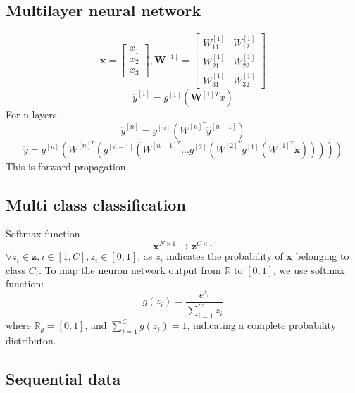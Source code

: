 \documentclass{article}
\begin{document}
\subsection*{Multilayer neural network}
\[\textbf{x} = \begin{bmatrix}
    x_1 \\ x_2\\x_3
    \end{bmatrix}, \textbf{W}^{[1]} = \begin{bmatrix}
        W^{[1]}_{11} & W^{[1]}_{12} \\ W^{[1]}_{21} & W^{[1]}_{22}\\ W^{[1]}_{31} & W^{[1]}_{32} 
        \end{bmatrix}\]
        \[\hat{y}^{[1]} = g^{[1]}(\textbf{W}^{[1]T}x)\]
For n layers, 
\[\hat{y}^{[n]} = g^{[n]}(W^{[n]^T}\hat{y}^{[n-1]})\]
\[\hat{y} = g^{[n]}(W^{[n]^T}(g^{[n-1]}(W^{[n-1]^T}... g^{[2]}(W^{[2]^T} g^{[1]}(W^{[1]^T}\textbf{x})))))\]
This is forward propagation


\subsection*{Multi class classification}
Softmax function
\[\textbf{x}^{N\times 1} \rightarrow \textbf{z}^{C \times 1}\]
$\forall z_i \in \textbf{z}, i \in [1, C], z_i \in [0, 1]$, as $z_i$ indicates the probability of $\textbf{x}$ belonging to class $C_i$. 
To map the neuron network output from $\mathbb{R}$ to $[0, 1]$, we use softmax function: 
\[g(z_i) = \frac{e^{z_i}}{\sum_{i=1}^{C} z_i}\]
where $\mathbb{R}_g = [0, 1]$, and $\sum_{i=1}^{C} g(z_i) = 1$, indicating a complete probability distributon.








\subsection*{Sequential data}
\end{document}
